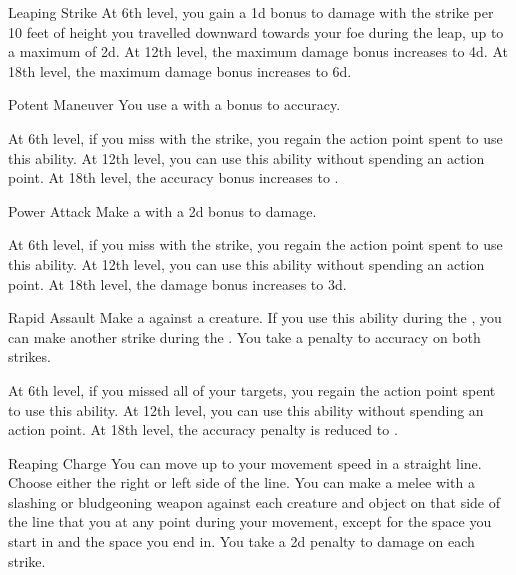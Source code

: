 {\begin{ability}{Leaping Strike}
                At 6th level, you gain a \plus1d bonus to damage with the strike per 10 feet of height you travelled downward towards your foe during the leap, up to a maximum of \plus2d.
                At 12th level, the maximum damage bonus increases to \plus4d.
                At 18th level, the maximum damage bonus increases to \plus6d.
            \end{ability}

            \begin{ability}{Potent Maneuver}
                You use a  with a  bonus to accuracy.

                At 6th level, if you miss with the strike, you regain the action point spent to use this ability.
                At 12th level, you can use this ability without spending an action point.
                At 18th level, the accuracy bonus increases to .
            \end{ability}

            \begin{ability}{Power Attack}
                Make a  with a \plus2d bonus to damage.

                At 6th level, if you miss with the strike, you regain the action point spent to use this ability.
                At 12th level, you can use this ability without spending an action point.
                At 18th level, the damage bonus increases to \plus3d.
            \end{ability}

            \begin{ability}{Rapid Assault}
                Make a  against a creature.
                If you use this ability during the , you can make another strike during the .
                You take a  penalty to accuracy on both strikes.

                At 6th level, if you missed all of your targets, you regain the action point spent to use this ability.
                At 12th level, you can use this ability without spending an action point.
                At 18th level, the accuracy penalty is reduced to .
            \end{ability}

            \begin{ability}{Reaping Charge}
                You can move up to your movement speed in a straight line.
                Choose either the right or left side of the line.
                You can make a melee  with a slashing or bludgeoning weapon against each creature and object on that side of the line that you  at any point during your movement, except for the space you start in and the space you end in.
                You take a \minus2d penalty to damage on each strike.


\end{ability}}
